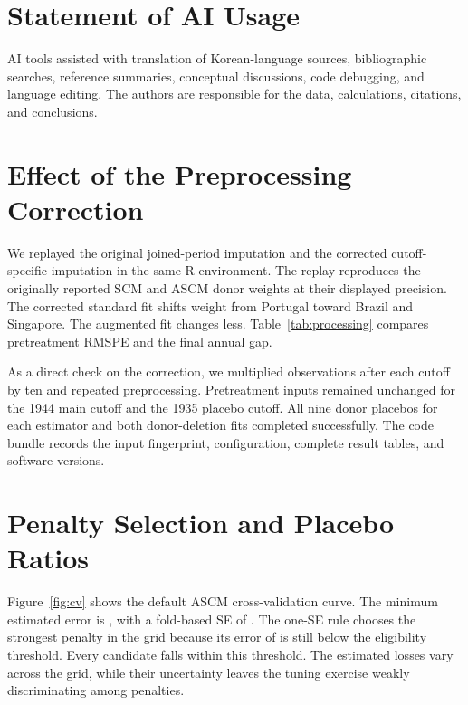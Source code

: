 \documentclass[12pt]{article}
\begin{document}
\section*{Statement of AI Usage}
AI tools assisted with translation of Korean-language sources, bibliographic searches, reference summaries, conceptual discussions, code debugging, and language editing. The authors are responsible for the data, calculations, citations, and conclusions.

\appendix
\section{Effect of the Preprocessing Correction}
\label{app:preprocessing}
We replayed the original joined-period imputation and the corrected cutoff-specific imputation in the same R environment. The replay reproduces the originally reported SCM and ASCM donor weights at their displayed precision. The corrected standard fit shifts weight from Portugal toward Brazil and Singapore. The augmented fit changes less. Table~\ref{tab:processing} compares pretreatment RMSPE and the final annual gap.

\begin{table}[htbp]
\centering
\caption{Original and corrected imputation in the same software environment}
\label{tab:processing}
\small

\caption*{\footnotesize Gaps and RMSPE are in 2011 international dollars per capita. The main text uses the corrected runs.}
\end{table}

As a direct check on the correction, we multiplied observations after each cutoff by ten and repeated preprocessing. Pretreatment inputs remained unchanged for the 1944 main cutoff and the 1935 placebo cutoff. All nine donor placebos for each estimator and both donor-deletion fits completed successfully. The code bundle records the input fingerprint, configuration, complete result tables, and software versions.

\FloatBarrier
\clearpage
\section{Penalty Selection and Placebo Ratios}
\label{app:placebo}
Figure~\ref{fig:cv} shows the default ASCM cross-validation curve. The minimum estimated error is \CVMinimumError{}, with a fold-based SE of \CVMinimumSE{}. The one-SE rule chooses the strongest penalty in the grid because its error of \CVOneSEError{} is still below the eligibility threshold. Every candidate falls within this threshold. The estimated losses vary across the grid, while their uncertainty leaves the tuning exercise weakly discriminating among penalties.
\end{document}
